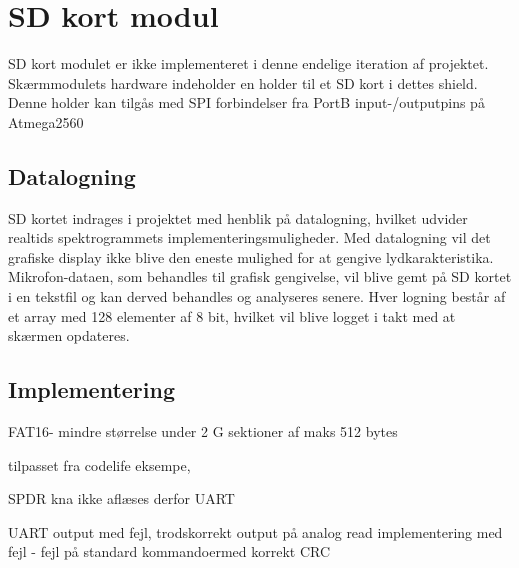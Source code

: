 \section{SD kort modul}

SD kort modulet er ikke implementeret i denne endelige iteration af projektet.\\


Skærmmodulets hardware indeholder en holder til et SD kort i dettes shield. Denne holder kan tilgås med SPI forbindelser fra PortB input-/outputpins på Atmega2560 

\subsection{Datalogning}
 
SD kortet indrages i projektet med henblik på datalogning, hvilket udvider realtids spektrogrammets implementeringsmuligheder. Med datalogning vil det grafiske display ikke blive den eneste mulighed for at gengive lydkarakteristika. Mikrofon-dataen, som behandles til grafisk gengivelse, vil blive gemt på SD kortet i en tekstfil og kan derved behandles og analyseres senere. Hver logning består af et array med 128 elementer af 8 bit, hvilket vil blive logget i takt med at skærmen opdateres.

\subsection{Implementering}


FAT16- mindre størrelse under 2 G
sektioner af maks 512 bytes  

tilpasset fra codelife eksempe,

SPDR kna ikke aflæses derfor UART

UART output med fejl, trodskorrekt output på analog
read implementering med fejl - fejl på standard kommandoermed korrekt CRC

